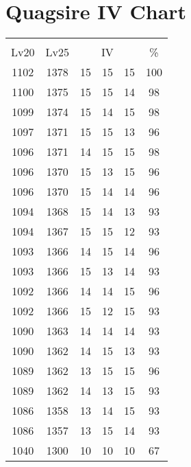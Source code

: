 \documentclass{article}%
\begin{document}
%
\normalsize%
\section{Quagsire IV Chart}%
\label{sec:Quagsire IV Chart}%
\renewcommand{\arraystretch}{1.5}%
\begin{tabular}{|c|c|c|c|c|c|}%
\hline%
\multicolumn{6}{|c|}{\textcolor{white}{ 
\linebreak{Quagsire}
}%
\cellcolor{black}}\\%
\multicolumn{1}{|c}{Lv20}&\multicolumn{1}{c|}{Lv25}&\multicolumn{3}{c|}{IV}&\multicolumn{1}{|c|}{\%}\\%
\hline%
\rowcolor{color100}%
1102&1378&15&15&15&100\\%
\hline%
\rowcolor{color98}%
1100&1375&15&15&14&98\\%
\hline%
\rowcolor{color98}%
1099&1374&15&14&15&98\\%
\hline%
\rowcolor{color96}%
1097&1371&15&15&13&96\\%
\hline%
\rowcolor{color98}%
1096&1371&14&15&15&98\\%
\hline%
\rowcolor{color96}%
1096&1370&15&13&15&96\\%
\hline%
\rowcolor{color96}%
1096&1370&15&14&14&96\\%
\hline%
\rowcolor{color93}%
1094&1368&15&14&13&93\\%
\hline%
\rowcolor{color93}%
1094&1367&15&15&12&93\\%
\hline%
\rowcolor{color96}%
1093&1366&14&15&14&96\\%
\hline%
\rowcolor{color93}%
1093&1366&15&13&14&93\\%
\hline%
\rowcolor{color96}%
1092&1366&14&14&15&96\\%
\hline%
\rowcolor{color93}%
1092&1366&15&12&15&93\\%
\hline%
\rowcolor{color93}%
1090&1363&14&14&14&93\\%
\hline%
\rowcolor{color93}%
1090&1362&14&15&13&93\\%
\hline%
\rowcolor{color96}%
1089&1362&13&15&15&96\\%
\hline%
\rowcolor{color93}%
1089&1362&14&13&15&93\\%
\hline%
\rowcolor{color93}%
1086&1358&13&14&15&93\\%
\hline%
\rowcolor{color93}%
1086&1357&13&15&14&93\\%
\hline%
\rowcolor{color91}%
1040&1300&10&10&10&67\\%
\end{tabular}

%
\end{document}
